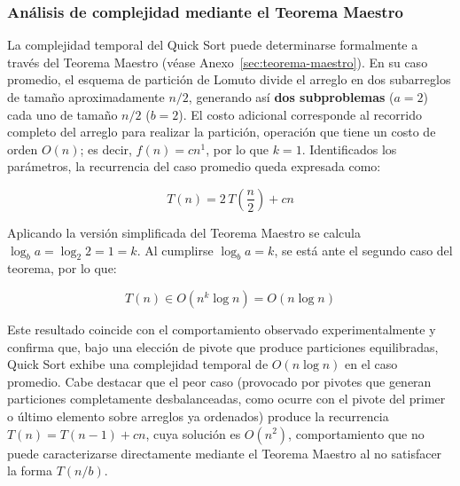 
\subsubsection{Análisis de complejidad mediante el Teorema Maestro}

La complejidad temporal del Quick Sort puede determinarse formalmente a través del Teorema Maestro (véase Anexo~\ref{sec:teorema-maestro}). En su caso promedio, el esquema de partición de Lomuto divide el arreglo en dos subarreglos de tamaño aproximadamente $n/2$, generando así \textbf{dos subproblemas} ($a = 2$) cada uno de tamaño $n/2$ ($b = 2$). El costo adicional corresponde al recorrido completo del arreglo para realizar la partición, operación que tiene un costo de orden $O(n)$; es decir, $f(n) = cn^1$, por lo que $k = 1$. Identificados los parámetros, la recurrencia del caso promedio queda expresada como:

\[T(n) = 2\,T\!\left(\frac{n}{2}\right) + cn\]

Aplicando la versión simplificada del Teorema Maestro se calcula $\log_b a = \log_2 2 = 1 = k$. Al cumplirse $\log_b a = k$, se está ante el segundo caso del teorema, por lo que:

\[T(n) \in O(n^k \log n) = O(n \log n)\]

Este resultado coincide con el comportamiento observado experimentalmente y confirma que, bajo una elección de pivote que produce particiones equilibradas, Quick Sort exhibe una complejidad temporal de $O(n \log n)$ en el caso promedio. Cabe destacar que el peor caso (provocado por pivotes que generan particiones completamente desbalanceadas, como ocurre con el pivote del primer o último elemento sobre arreglos ya ordenados) produce la recurrencia $T(n) = T(n-1) + cn$, cuya solución es $O(n^2)$, comportamiento que no puede caracterizarse directamente mediante el Teorema Maestro al no satisfacer la forma $T(n/b)$.